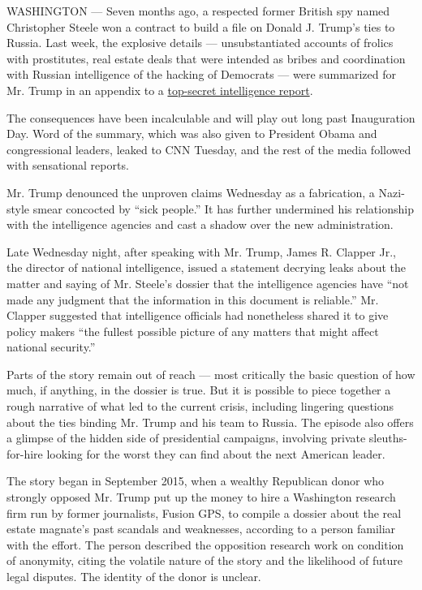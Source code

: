 WASHINGTON --- Seven months ago, a respected former British spy named
Christopher Steele won a contract to build a file on Donald J. Trump's
ties to Russia. Last week, the explosive details --- unsubstantiated
accounts of frolics with prostitutes, real estate deals that were
intended as bribes and coordination with Russian intelligence of the
hacking of Democrats --- were summarized for Mr. Trump in an appendix to
a
\href{https://www.nytimes.com/2017/01/06/us/politics/donald-trump-wall-hack-russia.html}{top-secret
intelligence report}.

The consequences have been incalculable and will play out long past
Inauguration Day. Word of the summary, which was also given to President
Obama and congressional leaders, leaked to CNN Tuesday, and the rest of
the media followed with sensational reports.

Mr. Trump denounced the unproven claims Wednesday as a fabrication, a
Nazi-style smear concocted by ``sick people.'' It has further undermined
his relationship with the intelligence agencies and cast a shadow over
the new administration.

Late Wednesday night, after speaking with Mr. Trump, James R. Clapper
Jr., the director of national intelligence, issued a statement decrying
leaks about the matter and saying of Mr. Steele's dossier that the
intelligence agencies have ``not made any judgment that the information
in this document is reliable.'' Mr. Clapper suggested that intelligence
officials had nonetheless shared it to give policy makers ``the fullest
possible picture of any matters that might affect national security.''

Parts of the story remain out of reach --- most critically the basic
question of how much, if anything, in the dossier is true. But it is
possible to piece together a rough narrative of what led to the current
crisis, including lingering questions about the ties binding Mr. Trump
and his team to Russia. The episode also offers a glimpse of the hidden
side of presidential campaigns, involving private sleuths-for-hire
looking for the worst they can find about the next American leader.

The story began in September 2015, when a wealthy Republican donor who
strongly opposed Mr. Trump put up the money to hire a Washington
research firm run by former journalists, Fusion GPS, to compile a
dossier about the real estate magnate's past scandals and weaknesses,
according to a person familiar with the effort. The person described the
opposition research work on condition of anonymity, citing the volatile
nature of the story and the likelihood of future legal disputes. The
identity of the donor is unclear.

